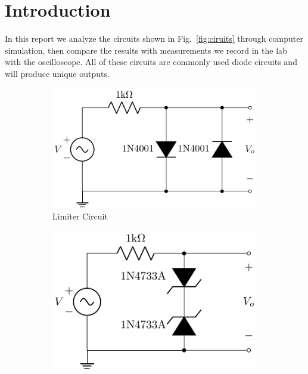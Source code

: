 \documentclass{../../ece-report}
\begin{document}
\maketitle

\section{Introduction}

In this report we analyze the circuits shown in Fig.~\ref{fig:ciruits}
through computer simulation, then compare the results
with measurements we record in the lab with the oscilloscope.
All of these circuits are commonly used diode circuits
and will produce unique outputs.

\begin{figure}[h!]
  \centering
  \begin{subfigure}{.45\textwidth}
    \includegraphics[width=\textwidth]{../circuits/circuit_a.pdf}
    \caption{Limiter Circuit}
    \label{fig:circuit_a}
  \end{subfigure}
  \begin{subfigure}{.45\textwidth}
    \includegraphics[width=\textwidth]{../circuits/circuit_b.pdf}

\end{subfigure}
\end{figure}
\end{document}
